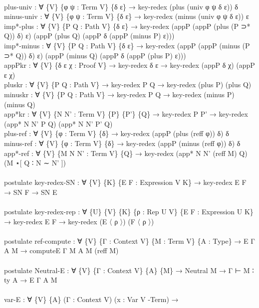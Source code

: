 {\begin{code}
{\>\<\\
\>  plus-univ : ∀ \{V\} \{φ ψ : Term V\} \{δ ε\} → key-redex (plus (univ φ ψ δ ε)) δ\<\\
\>  minus-univ : ∀ \{V\} \{φ ψ : Term V\} \{δ ε\} → key-redex (minus (univ φ ψ δ ε)) ε\<\\
\>  imp*-plus : ∀ \{V\} \{P Q : Path V\} \{δ ε\} → key-redex (appP (appP (plus (P ⊃* Q)) δ) ε) (appP (plus Q) (appP δ (appP (minus P) ε)))\<\\
\>  imp*-minus : ∀ \{V\} \{P Q : Path V\} \{δ ε\} → key-redex (appP (appP (minus (P ⊃* Q)) δ) ε) (appP (minus Q) (appP δ (appP (plus P) ε)))\<\\
\>  appPkr : ∀ \{V\} \{δ ε χ : Proof V\} → key-redex δ ε → key-redex (appP δ χ) (appP ε χ)\<\\
\>  pluskr : ∀ \{V\} \{P Q : Path V\} → key-redex P Q → key-redex (plus P) (plus Q)\<\\
\>  minuskr : ∀ \{V\} \{P Q : Path V\} → key-redex P Q → key-redex (minus P) (minus Q)\<\\
\>  app*kr : ∀ \{V\} \{N N' : Term V\} \{P\} \{P'\} \{Q\} → key-redex P P' → key-redex (app* N N' P Q) (app* N N' P' Q)\<\\
\>  plus-ref : ∀ \{V\} \{φ : Term V\} \{δ\} → key-redex (appP (plus (reff φ)) δ) δ\<\\
\>  minus-ref : ∀ \{V\} \{φ : Term V\} \{δ\} → key-redex (appP (minus (reff φ)) δ) δ\<\\
\>  app*-ref : ∀ \{V\} \{M N N' : Term V\} \{Q\} → key-redex (app* N N' (reff M) Q) (M ⋆[ Q ∶ N ∼ N' ])\<\\
\>\<\\
\>postulate key-redex-SN : ∀ \{V\} \{K\} \{E F : Expression V K\} → key-redex E F → SN F → SN E\<\\
\>\<\\
\>postulate key-redex-rep : ∀ \{U\} \{V\} \{K\} \{ρ : Rep U V\} \{E F : Expression U K\} → key-redex E F → key-redex (E 〈 ρ 〉) (F 〈 ρ 〉)\<\\
\>\<\\
\>postulate ref-compute : ∀ \{V\} \{Γ : Context V\} \{M : Term V\} \{A : Type\} → E Γ A M → computeE Γ M A M (reff M)\<\\
\>\<\\
\>postulate Neutral-E : ∀ \{V\} \{Γ : Context V\} \{A\} \{M\} → Neutral M → Γ ⊢ M ∶ ty A → E Γ A M\<\\
\>\<\\
\>var-E : ∀ \{V\} \{A\} (Γ : Context V) (x : Var V -Term) → \<\\
}
\end{code}}
